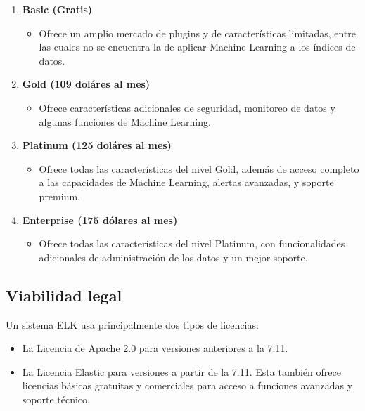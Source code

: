 \begin{enumerate}
    \item \textbf{Basic (Gratis)}
\begin{itemize}
        \item Ofrece un amplio mercado de plugins y de características limitadas, entre las cuales no se encuentra la de aplicar Machine Learning a los índices de datos.
    \end{itemize}

    \item \textbf{Gold (109 doláres al mes)}
    \begin{itemize}
        \item Ofrece características adicionales de seguridad, monitoreo de datos y algunas funciones de Machine Learning.
    \end{itemize}
    \item \textbf{Platinum (125 doláres al mes)}
    \begin{itemize}
        \item Ofrece todas las características del nivel Gold, además de acceso completo a las capacidades de Machine Learning, alertas avanzadas, y soporte premium.
    \end{itemize}
    \item \textbf{Enterprise (175 dólares al mes)}
    \begin{itemize}
        \item Ofrece todas las características del nivel Platinum, con funcionalidades adicionales de administración de los datos y un mejor soporte.
    \end{itemize}
\end{enumerate}

\subsection{Viabilidad legal}
Un sistema ELK usa principalmente dos tipos de licencias: 
\begin{itemize}
    \item La Licencia de Apache 2.0 para versiones anteriores a la 7.11.
    \item La Licencia Elastic para versiones a partir de la 7.11. Esta también ofrece licencias básicas gratuitas y comerciales para acceso a funciones avanzadas y soporte técnico.
\end{itemize}

